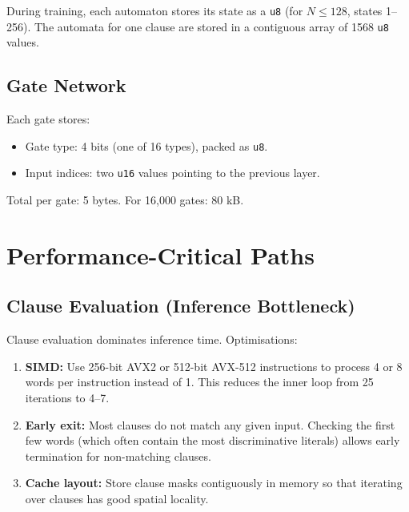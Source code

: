 During training, each automaton stores its state as a \texttt{u8}
(for $N \leq 128$, states 1--256). The automata for one clause are
stored in a contiguous array of 1568 \texttt{u8} values.

\subsection{Gate Network}

Each gate stores:
\begin{itemize}
  \item Gate type: 4 bits (one of 16 types), packed as \texttt{u8}.
  \item Input indices: two \texttt{u16} values pointing to the
    previous layer.
\end{itemize}

Total per gate: 5 bytes. For 16,000 gates: 80 kB.


\section{Performance-Critical Paths}
\label{sec:critical-paths}

\subsection{Clause Evaluation (Inference Bottleneck)}

Clause evaluation dominates inference time. Optimisations:

\begin{enumerate}
  \item \textbf{SIMD:} Use 256-bit AVX2 or 512-bit AVX-512
    instructions to process 4 or 8 words per instruction instead
    of 1. This reduces the inner loop from 25 iterations to 4--7.

  \item \textbf{Early exit:} Most clauses do not match any given
    input. Checking the first few words (which often contain the
    most discriminative literals) allows early termination for
    non-matching clauses.

  \item \textbf{Cache layout:} Store clause masks contiguously in
    memory so that iterating over clauses has good spatial locality.
\end{enumerate}

